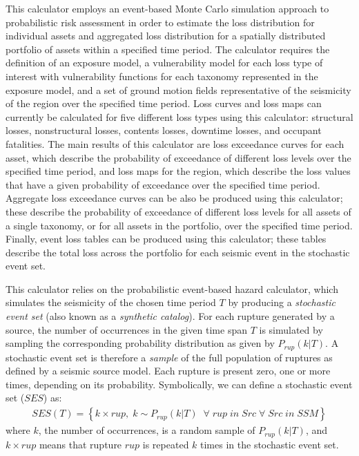 This calculator employs an event-based Monte Carlo simulation approach to probabilistic risk assessment in order to estimate the loss distribution for individual assets and aggregated loss distribution for a spatially distributed portfolio of assets within a specified time period. The calculator requires the definition of an exposure model, a vulnerability model for each loss type of interest with vulnerability functions for each taxonomy represented in the exposure model, and a set of ground motion fields representative of the seismicity of the region over the specified time period. Loss curves and loss maps can currently be calculated for five different loss types using this calculator: structural losses, nonstructural losses, contents losses, downtime losses, and occupant fatalities. The main results of this calculator are loss exceedance curves for each asset, which describe the probability of exceedance of different loss levels over the specified time period, and loss maps for the region, which describe the loss values that have a given probability of exceedance over the specified time period. Aggregate loss exceedance curves can be also be produced using this calculator; these describe the probability of exceedance of different loss levels for all assets of a single taxonomy, or for all assets in the portfolio, over the specified time period. Finally, event loss tables can be produced using this calculator; these tables describe the total loss across the portfolio for each seismic event in the stochastic event set.

This calculator relies on the probabilistic event-based hazard calculator, which simulates the seismicity of the chosen time period $T$ by producing a \textit{stochastic event set} (also known as a \textit{synthetic catalog}). For each rupture generated by a source, the number of occurrences in the given time span $T$ is simulated by sampling the corresponding probability distribution as given by $P_{rup}(k | T)$. A stochastic event set is therefore a \textit{sample} of the full population of ruptures as defined by a seismic source model. Each rupture is present zero, one or more times, depending on its probability. Symbolically, we can define a stochastic event set ($SES$) as:
\begin{align}
SES(T) = \left\{k \times rup,\;k\sim P_{rup}(k | T)\;\;\forall\;rup\;in\;Src\;\forall\;Src\;in\;SSM\right\}
\end{align}
where $k$, the number of occurrences, is a random sample of $P_{rup}(k | T)$, and $k \times rup$ means that rupture $rup$ is repeated $k$ times in the stochastic event set.

